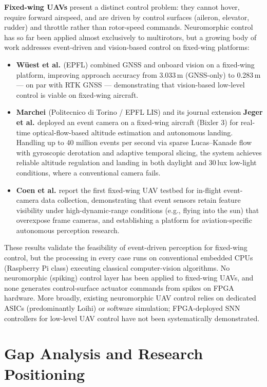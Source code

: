 \documentclass[12pt,a4paper]{article}
\begin{document}
\textbf{Fixed-wing UAVs} present a distinct control problem: they cannot hover, require forward airspeed, and are driven by control surfaces (aileron, elevator, rudder) and throttle rather than rotor-speed commands. Neuromorphic control has so far been applied almost exclusively to multirotors, but a growing body of work addresses event-driven and vision-based control on fixed-wing platforms:
\begin{itemize}
    \item \textbf{W\"uest et al. \cite{Wuest2022}} (EPFL) combined GNSS and onboard vision on a fixed-wing platform, improving approach accuracy from 3.033\,m (GNSS-only) to 0.283\,m --- on par with RTK GNSS --- demonstrating that vision-based low-level control is viable on fixed-wing aircraft.
    \item \textbf{Marchei \cite{Marchei2024}} (Politecnico di Torino / EPFL LIS) and its journal extension \textbf{Jeger et al. \cite{Jeger2026}} deployed an event camera on a fixed-wing aircraft (Bixler 3) for real-time optical-flow-based altitude estimation and autonomous landing. Handling up to 40 million events per second via sparse Lucas--Kanade flow with gyroscopic derotation and adaptive temporal slicing, the system achieves reliable altitude regulation and landing in both daylight and 30\,lux low-light conditions, where a conventional camera fails.
    \item \textbf{Coen et al. \cite{Coen2026}} report the first fixed-wing UAV testbed for in-flight event-camera data collection, demonstrating that event sensors retain feature visibility under high-dynamic-range conditions (e.g., flying into the sun) that overexpose frame cameras, and establishing a platform for aviation-specific autonomous perception research.
\end{itemize}
These results validate the feasibility of event-driven perception for fixed-wing control, but the processing in every case runs on conventional embedded CPUs (Raspberry Pi class) executing classical computer-vision algorithms. No neuromorphic (spiking) control layer has been applied to fixed-wing UAVs, and none generates control-surface actuator commands from spikes on FPGA hardware. More broadly, existing neuromorphic UAV control relies on dedicated ASICs (predominantly Loihi) or software simulation; FPGA-deployed SNN controllers for low-level UAV control have not been systematically demonstrated.

\section{Gap Analysis and Research Positioning}
\label{sec:gap}
\end{document}
